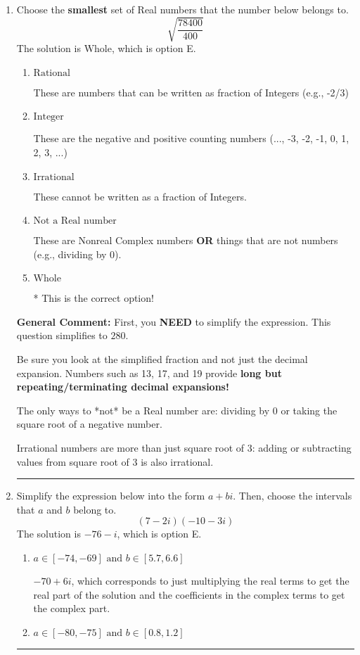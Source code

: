 \documentclass{extbook}[14pt]
\newcommand{\litem}[1]{\item #1

\rule{\textwidth}{0.4pt}}
\begin{document}
\begin{enumerate}\litem{
Choose the \textbf{smallest} set of Real numbers that the number below belongs to.
\[ \sqrt{\frac{78400}{400}} \]The solution is \( \text{Whole} \), which is option E.\begin{enumerate}[label=\Alph*.]
\item \( \text{Rational} \)

These are numbers that can be written as fraction of Integers (e.g., -2/3)
\item \( \text{Integer} \)

These are the negative and positive counting numbers (..., -3, -2, -1, 0, 1, 2, 3, ...)
\item \( \text{Irrational} \)

These cannot be written as a fraction of Integers.
\item \( \text{Not a Real number} \)

These are Nonreal Complex numbers \textbf{OR} things that are not numbers (e.g., dividing by 0).
\item \( \text{Whole} \)

* This is the correct option!
\end{enumerate}

\textbf{General Comment:} First, you \textbf{NEED} to simplify the expression. This question simplifies to $280$. 
 
 Be sure you look at the simplified fraction and not just the decimal expansion. Numbers such as 13, 17, and 19 provide \textbf{long but repeating/terminating decimal expansions!} 
 
 The only ways to *not* be a Real number are: dividing by 0 or taking the square root of a negative number. 
 
 Irrational numbers are more than just square root of 3: adding or subtracting values from square root of 3 is also irrational.
}
\litem{
Simplify the expression below into the form $a+bi$. Then, choose the intervals that $a$ and $b$ belong to.
\[ (7 - 2 i)(-10 - 3 i) \]The solution is \( -76 - i \), which is option E.\begin{enumerate}[label=\Alph*.]
\item \( a \in [-74, -69] \text{ and } b \in [5.7, 6.6] \)

 $-70 + 6 i$, which corresponds to just multiplying the real terms to get the real part of the solution and the coefficients in the complex terms to get the complex part.
\item \( a \in [-80, -75] \text{ and } b \in [0.8, 1.2] \)


\end{enumerate}}
\end{enumerate}
\end{document}
